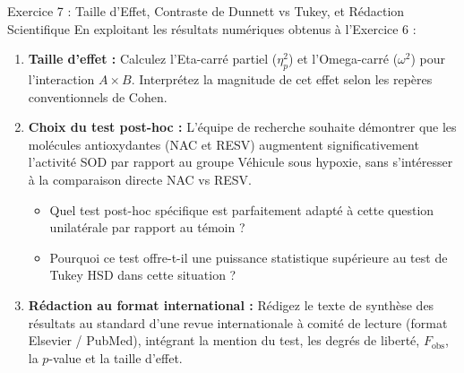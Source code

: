 \documentclass[11pt,a4paper]{article}
\begin{document}
\begin{exercicebox}{Exercice 7 : Taille d'Effet, Contraste de Dunnett vs Tukey, et Rédaction Scientifique}
En exploitant les résultats numériques obtenus à l'Exercice 6 :
\begin{enumerate}[label=\textbf{\alph*.}]
  \item \textbf{Taille d'effet :} Calculez l'Eta-carré partiel ($\eta_p^2$) et l'Omega-carré ($\omega^2$) pour l'interaction $A \times B$. Interprétez la magnitude de cet effet selon les repères conventionnels de Cohen.
  \item \textbf{Choix du test post-hoc :} L'équipe de recherche souhaite démontrer que les molécules antioxydantes (NAC et RESV) augmentent significativement l'activité SOD par rapport au groupe Véhicule sous hypoxie, sans s'intéresser à la comparaison directe NAC vs RESV.
  \begin{itemize}
    \item Quel test post-hoc spécifique est parfaitement adapté à cette question unilatérale par rapport au témoin ?
    \item Pourquoi ce test offre-t-il une puissance statistique supérieure au test de Tukey HSD dans cette situation ?
  \end{itemize}
  \item \textbf{Rédaction au format international :} Rédigez le texte de synthèse des résultats au standard d'une revue internationale à comité de lecture (format Elsevier / PubMed), intégrant la mention du test, les degrés de liberté, $F_{\text{obs}}$, la $p$-value et la taille d'effet.
\end{enumerate}
\end{exercicebox}
\end{document}
